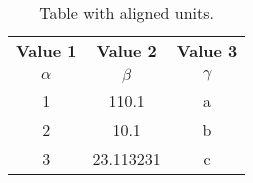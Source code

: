 \documentclass{article}
\begin{document}
\begin{table}[h!]
	\begin{center}
		\caption{Table with aligned units.}
		\label{tab:table1}
		\begin{tabular}{c|c|c} 
			\textbf{Value 1} & \textbf{Value 2} &
			\textbf{Value 3}\\
			$\alpha$ & $\beta$ & $\gamma$ \\
			\hline
			1 & 110.1 & a\\
			2 & 10.1 & b\\
			3 & 23.113231 & c\\
		\end{tabular}
	\end{center}
\end{table}
\end{document}
